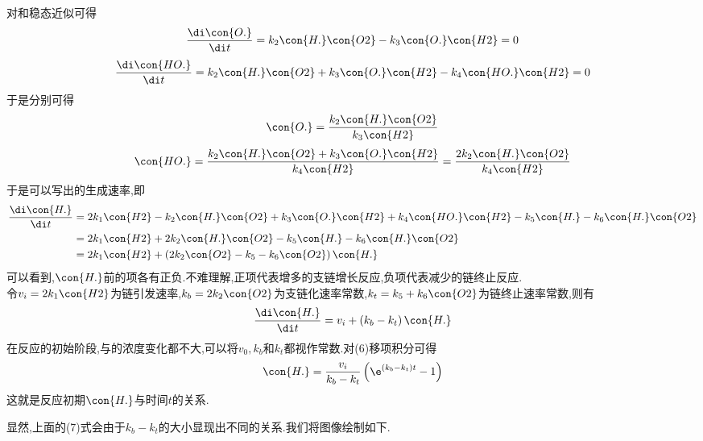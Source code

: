 \documentclass{ctexart}
\begin{document}
\begin{derivation}\setcounter{equation}{0}
    对和稳态近似可得
    \begin{equation}
        \dfrac{\di\con{O.}}{\di t}=k_2\con{H.}\con{O2}-k_3\con{O.}\con{H2}=0
    \end{equation}
    \begin{equation}
        \dfrac{\di\con{HO.}}{\di t}=k_2\con{H.}\con{O2}+k_3\con{O.}\con{H2}-k_4\con{HO.}\con{H2}=0
    \end{equation}
    于是分别可得
    \begin{equation}
        \con{O.}=\dfrac{k_2\con{H.}\con{O2}}{k_3\con{H2}}
    \end{equation}
    \begin{equation}
        \con{HO.}
        =\dfrac{k_2\con{H.}\con{O2}+k_3\con{O.}\con{H2}}{k_4\con{H2}}
        =\dfrac{2k_2\con{H.}\con{O2}}{k_4\con{H2}}
    \end{equation}
    于是可以写出的生成速率,即
    \begin{equation}
        \begin{aligned}
            \dfrac{\di\con{H.}}{\di t}
            &= 2k_1\con{H2}-k_2\con{H.}\con{O2}+k_3\con{O.}\con{H2}+k_4\con{HO.}\con{H2}-k_5\con{H.}-k_6\con{H.}\con{O2} \\
            &= 2k_1\con{H2}+2k_2\con{H.}\con{O2}-k_5\con{H.}-k_6\con{H.}\con{O2} \\
            &= 2k_1\con{H2}+\left(2k_2\con{O2}-k_5-k_6\con{O2}\right)\con{H.}
        \end{aligned}
    \end{equation}
    可以看到,$\con{H.}$前的项各有正负.不难理解,正项代表增多的支链增长反应,负项代表减少的链终止反应.\\
    令$v_i=2k_1\con{H2}$为链引发速率,$k_b=2k_2\con{O2}$为支链化速率常数,$k_t=k_5+k_6\con{O2}$为链终止速率常数,则有
    \begin{equation}
        \dfrac{\di\con{H.}}{\di t}=v_i+\left(k_b-k_t\right)\con{H.}
    \end{equation}
    在反应的初始阶段,与的浓度变化都不大,可以将$v_0,k_b$和$k_t$都视作常数.对(6)移项积分可得
    \begin{equation}
        \con{H.}=\dfrac{v_i}{k_b-k_t}\left(\e^{\left(k_b-k_t\right)t}-1\right)
    \end{equation}
    这就是反应初期$\con{H.}$与时间$t$的关系.
\end{derivation}
显然,上面的(7)式会由于$k_b-k_t$的大小显现出不同的关系.我们将图像绘制如下.
\end{document}

